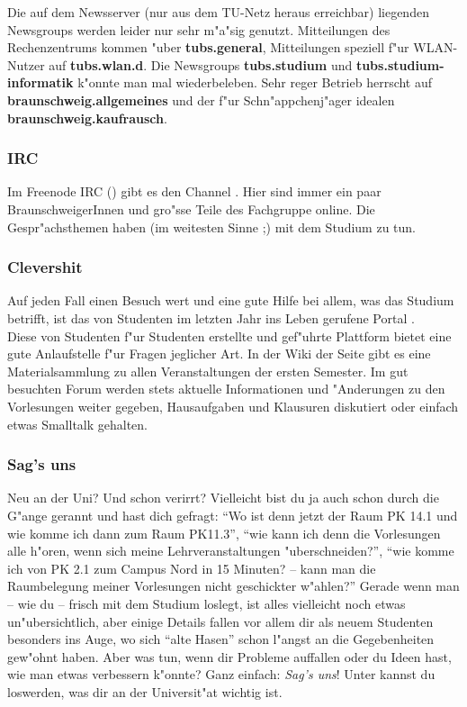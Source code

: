 Die auf dem Newsserver  (nur aus dem TU-Netz heraus
erreichbar) liegenden Newsgroups werden leider nur sehr m"a"sig genutzt.
Mitteilungen des Rechenzentrums kommen "uber \textbf{tubs.general},
Mitteilungen speziell f"ur WLAN-Nutzer auf \textbf{tubs.wlan.d}. Die Newsgroups
\textbf{tubs.studium} und \textbf{tubs.studium-informatik} k"onnte man mal
wiederbeleben. Sehr reger Betrieb herrscht auf
\textbf{braunschweig.allgemeines} und der f"ur Schn"appchenj"ager idealen
\textbf{braunschweig.kaufrausch}.

\subsubsection*{IRC}

Im Freenode IRC () gibt es den Channel . Hier
sind immer ein paar BraunschweigerInnen und gro"sse Teile des Fachgruppe online. Die Gespr"achsthemen haben (im weitesten
Sinne ;) mit dem Studium zu tun.

\subsubsection*{Clevershit}

Auf jeden Fall einen Besuch wert und eine gute Hilfe bei allem, was das Studium betrifft, ist das von Studenten im letzten Jahr ins Leben gerufene Portal \mbox{}.\\
Diese von Studenten f"ur Studenten erstellte und gef"uhrte Plattform bietet eine gute Anlaufstelle f"ur Fragen jeglicher Art. In der Wiki der Seite gibt es eine Materialsammlung zu allen Veranstaltungen der ersten Semester. Im gut besuchten Forum werden stets aktuelle Informationen und "Anderungen zu den Vorlesungen weiter gegeben, Hausaufgaben und Klausuren diskutiert oder einfach etwas Smalltalk gehalten.

\subsubsection*{Sag's uns}
Neu an der Uni?
Und schon verirrt?
Vielleicht bist du ja auch schon durch die G"ange gerannt und hast dich gefragt:
"`Wo ist denn jetzt der Raum PK 14.1 und wie komme ich dann zum Raum PK11.3"',  "`wie kann ich denn die Vorlesungen alle h"oren, wenn sich meine Lehrveranstaltungen "uberschneiden?"', "`wie komme ich von PK 2.1 zum Campus Nord in 15 Minuten? – kann man die Raumbelegung meiner Vorlesungen nicht geschickter w"ahlen?"'
 Gerade wenn man – wie du – frisch mit dem Studium loslegt, ist alles vielleicht noch etwas un"ubersichtlich, aber einige Details fallen vor allem dir als neuem Studenten besonders ins Auge, wo sich "`alte Hasen"' schon l"angst an die Gegebenheiten gew"ohnt haben.
Aber was tun, wenn dir Probleme auffallen oder du Ideen hast, wie man etwas verbessern k"onnte? Ganz einfach: \emph{Sag's uns}!
Unter  kannst du loswerden, was dir an der Universit"at wichtig ist.

